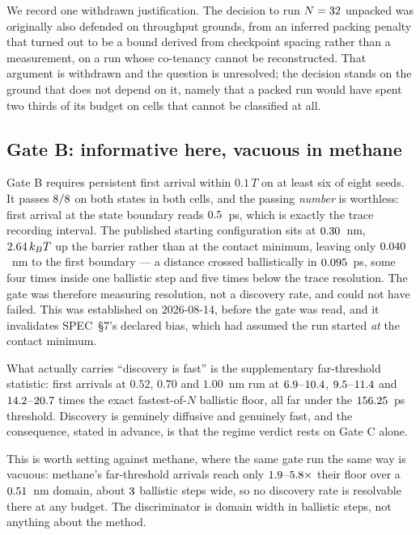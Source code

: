 We record one withdrawn justification. The decision to run $N = 32$ unpacked was originally
also defended on throughput grounds, from an inferred packing penalty that turned out to be a
bound derived from checkpoint spacing rather than a measurement, on a run whose co-tenancy cannot
be reconstructed. That argument is withdrawn and the question is unresolved; the decision stands
on the ground that does not depend on it, namely that a packed run would have spent two thirds of
its budget on cells that cannot be classified at all.

\subsection{Gate B: informative here, vacuous in methane}

Gate B requires persistent first arrival within $0.1\,T$ on at least six of eight seeds. It
passes $8/8$ on both states in both cells, and the passing \emph{number} is worthless:
first arrival at the state boundary reads $0.5$~ps, which is exactly the trace recording
interval. The published starting configuration sits at $0.30$~nm, $2.64\,k_BT$
up the barrier rather than at the contact minimum, leaving only $0.040$~nm to the first
boundary --- a distance crossed ballistically in $0.095$~ps, some four times inside one
ballistic step and five times below the trace resolution. The gate was therefore measuring
resolution, not a discovery rate, and could not have failed. This was established on 2026-08-14,
before the gate was read, and it invalidates SPEC~\S7's declared bias, which had assumed the run
started \emph{at} the contact minimum.

What actually carries ``discovery is fast'' is the supplementary far-threshold statistic: first
arrivals at $0.52$, $0.70$ and $1.00$~nm run at $6.9$--$10.4$,
$9.5$--$11.4$ and $14.2$--$20.7$ times the exact fastest-of-$N$
ballistic floor, all far under the $156.25$~ps threshold. Discovery is genuinely
diffusive and genuinely fast, and the consequence, stated in advance, is that the regime verdict
rests on Gate C alone.

This is worth setting against methane, where the same gate run the same way is vacuous: methane's
far-threshold arrivals reach only $1.9$--$5.8\times$ their floor over a
$0.51$~nm domain, about $3$ ballistic steps wide, so no discovery rate
is resolvable there at any budget. The discriminator is domain width in ballistic steps, not
anything about the method.

